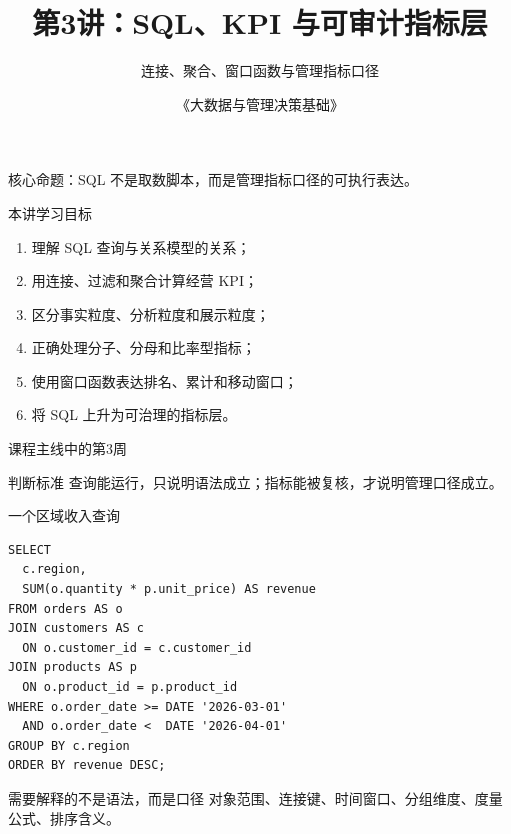 \documentclass[UTF8,fontset=fandol,aspectratio=169,11pt]{ctexbeamer}
\title[SQL、KPI 与指标层]{第3讲：SQL、KPI 与可审计指标层}
\subtitle{连接、聚合、窗口函数与管理指标口径}
\author{《大数据与管理决策基础》}
\date{}
\begin{document}
\begin{frame}
  \titlepage
  \begin{center}
    \small 核心命题：SQL 不是取数脚本，而是管理指标口径的可执行表达。
  \end{center}
\end{frame}

\begin{frame}{本讲学习目标}
\begin{enumerate}
  \item 理解 SQL 查询与关系模型的关系；
  \item 用连接、过滤和聚合计算经营 KPI；
  \item 区分事实粒度、分析粒度和展示粒度；
  \item 正确处理分子、分母和比率型指标；
  \item 使用窗口函数表达排名、累计和移动窗口；
  \item 将 SQL 上升为可治理的指标层。
\end{enumerate}
\end{frame}

\begin{frame}{课程主线中的第3周}
\begin{center}
\end{center}

\begin{alertblock}{判断标准}
查询能运行，只说明语法成立；指标能被复核，才说明管理口径成立。
\end{alertblock}
\end{frame}

\begin{frame}[fragile]{一个区域收入查询}
\begin{lstlisting}
SELECT
  c.region,
  SUM(o.quantity * p.unit_price) AS revenue
FROM orders AS o
JOIN customers AS c
  ON o.customer_id = c.customer_id
JOIN products AS p
  ON o.product_id = p.product_id
WHERE o.order_date >= DATE '2026-03-01'
  AND o.order_date <  DATE '2026-04-01'
GROUP BY c.region
ORDER BY revenue DESC;
\end{lstlisting}

\begin{block}{需要解释的不是语法，而是口径}
对象范围、连接键、时间窗口、分组维度、度量公式、排序含义。
\end{block}
\end{frame}
\end{document}
